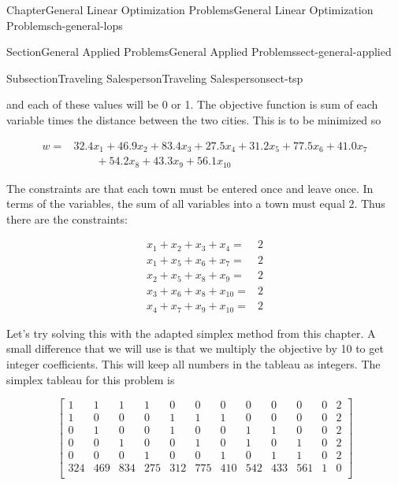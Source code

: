 \documentclass[oneside,10pt,]{book}
\numberwithin{equation}{section}
\newcommand{\amp}{&}
\begin{document}
\begin{chapterptx}{Chapter}{General Linear Optimization Problems}{}{General Linear Optimization Problems}{}{}{ch-general-lops}
\begin{sectionptx}{Section}{General Applied Problems}{}{General Applied Problems}{}{}{sect-general-applied}
\begin{subsectionptx}{Subsection}{Traveling Salesperson}{}{Traveling Salesperson}{}{}{sect-tsp}
\begin{equation*}
\end{equation*}
%
\par
and each of these values will be 0 or 1. The objective function is sum of each variable times the distance between the two cities. This is to be minimized so%
\par
%
\begin{equation*}
\begin{aligned} w = \amp 32.4 x_1 + 46.9 x_2 + 83.4 x_3 + 27.5 x_4 + 31.2 x_5 + 77.5 x_6 + 41.0 x_7 \\ \amp \qquad + 54.2 x_8 + 43.3 x_9 + 56.1 x_{10} \end{aligned}
\end{equation*}
%
\par
The constraints are that each town must be entered once and leave once. In terms of the variables, the sum of all variables into a town must equal 2. Thus there are the constraints:%
\par
%
\begin{equation*}
\begin{aligned} x_1 + x_2 + x_3 + x_4    = \amp 2 \\ x_1 + x_5 + x_6 + x_7    = \amp 2 \\ x_2 + x_5 + x_8 + x_9    = \amp 2 \\ x_3 + x_6 + x_8 + x_{10} = \amp 2 \\ x_4 + x_7 + x_9 + x_{10} = \amp 2 \end{aligned}
\end{equation*}
%
\par
Let's try solving this with the adapted simplex method from this chapter. A small difference that we will use is that we multiply the objective by 10 to get integer coefficients. This will keep all numbers in the tableau as integers. The simplex tableau for this problem is%
\par
%
\begin{equation*}
\left[\begin{array}{rrrrrrrrrrr|r} 1 \amp 1 \amp 1 \amp 1 \amp 0 \amp 0 \amp 0 \amp 0 \amp 0 \amp 0 \amp 0 \amp 2\\ 1 \amp 0 \amp 0 \amp 0 \amp 1 \amp 1 \amp 1 \amp 0 \amp 0 \amp 0 \amp 0 \amp 2\\ 0 \amp 1 \amp 0 \amp 0 \amp 1 \amp 0 \amp 0 \amp 1 \amp 1 \amp 0 \amp 0 \amp 2\\ 0 \amp 0 \amp 1 \amp 0 \amp 0 \amp 1 \amp 0 \amp 1 \amp 0 \amp 1 \amp 0 \amp 2\\ 0 \amp 0 \amp 0 \amp 1 \amp 0 \amp 0 \amp 1 \amp 0 \amp 1 \amp 1 \amp 0 \amp 2\\ \hline 324 \amp 469 \amp 834 \amp 275 \amp 312 \amp 775 \amp 410 \amp 542 \amp 433 \amp 561 \amp 1 \amp 0\\ \end{array} \right]

\end{equation*}
\end{subsectionptx}
\end{sectionptx}
\end{chapterptx}
\end{document}
